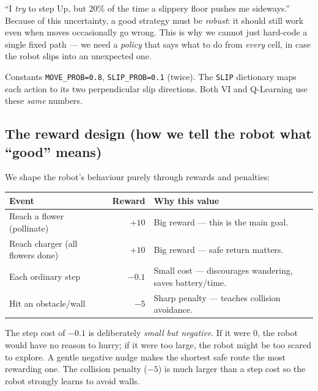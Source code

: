 \documentclass[11pt]{article}
\begin{document}
\begin{intuition}
``I \emph{try} to step Up, but 20\% of the time a slippery floor pushes me
sideways.'' Because of this uncertainty, a good strategy must be \emph{robust}:
it should still work even when moves occasionally go wrong. This is why we cannot
just hard-code a single fixed path --- we need a \emph{policy} that says what to
do from \emph{every} cell, in case the robot slips into an unexpected one.
\end{intuition}

\begin{codebox}
Constants \texttt{MOVE\_PROB=0.8}, \texttt{SLIP\_PROB=0.1} (twice). The
\texttt{SLIP} dictionary maps each action to its two perpendicular slip
directions. Both VI and Q-Learning use these \emph{same} numbers.
\end{codebox}

\subsection{The reward design (how we tell the robot what ``good'' means)}

We shape the robot's behaviour purely through rewards and penalties:

\begin{center}
\renewcommand{\arraystretch}{1.3}
\begin{tabular}{@{}l r p{6.5cm}@{}}
\toprule
\textbf{Event} & \textbf{Reward} & \textbf{Why this value} \\
\midrule
Reach a flower (pollinate) & $+10$ & Big reward --- this is the main goal. \\
Reach charger (all flowers done) & $+10$ & Big reward --- safe return matters. \\
Each ordinary step & $-0.1$ & Small cost --- discourages wandering, saves battery/time. \\
Hit an obstacle/wall & $-5$ & Sharp penalty --- teaches collision avoidance. \\
\bottomrule
\end{tabular}
\end{center}

\begin{whybox}
The step cost of $-0.1$ is deliberately \emph{small but negative}. If it were
$0$, the robot would have no reason to hurry; if it were too large, the robot
might be too scared to explore. A gentle negative nudge makes the shortest safe
route the most rewarding one. The collision penalty ($-5$) is much larger than a
step cost so the robot strongly learns to avoid walls.
\end{whybox}
\end{document}
